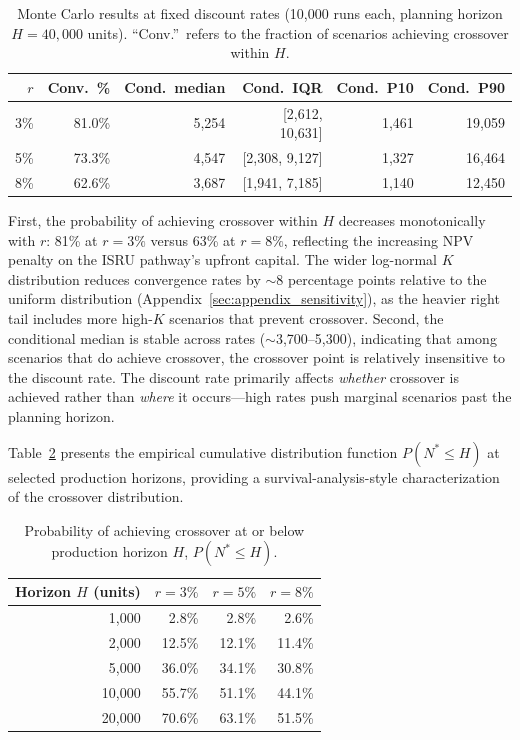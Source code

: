 \documentclass[preprint,12pt]{elsarticle}
\begin{document}
\begin{table}[htbp]
\centering
\caption{Monte Carlo results at fixed discount rates (10{,}000 runs each, planning horizon $H = 40{,}000$ units). ``Conv.''\ refers to the fraction of scenarios achieving crossover within $H$.}
\label{tab:mc_summary}
\small
\begin{tabular}{@{}rrrrrr@{}}
\toprule
$r$ & Conv.\ \% & Cond.\ median & Cond.\ IQR & Cond.\ P10 & Cond.\ P90 \\
\midrule
3\%  & 81.0\% & 5{,}254 & [2{,}612, 10{,}631] & 1{,}461 & 19{,}059 \\
5\%  & 73.3\% & 4{,}547 & [2{,}308, 9{,}127]  & 1{,}327 & 16{,}464 \\
8\%  & 62.6\% & 3{,}687 & [1{,}941, 7{,}185]  & 1{,}140 & 12{,}450 \\
\bottomrule
\end{tabular}
\end{table}

First, the probability of achieving crossover within $H$ decreases monotonically with $r$: 81\% at $r = 3\%$ versus 63\% at $r = 8\%$, reflecting the increasing NPV penalty on the ISRU pathway's upfront capital. The wider log-normal $K$ distribution reduces convergence rates by $\sim$8 percentage points relative to the uniform distribution (Appendix~\ref{sec:appendix_sensitivity}), as the heavier right tail includes more high-$K$ scenarios that prevent crossover. Second, the conditional median is stable across rates ($\sim$3{,}700--5{,}300), indicating that among scenarios that do achieve crossover, the crossover point is relatively insensitive to the discount rate. The discount rate primarily affects \emph{whether} crossover is achieved rather than \emph{where} it occurs---high rates push marginal scenarios past the planning horizon.

Table~\ref{tab:convergence} presents the empirical cumulative distribution function $P(N^* \leq H)$ at selected production horizons, providing a survival-analysis-style characterization of the crossover distribution.

\begin{table}[htbp]
\centering
\caption{Probability of achieving crossover at or below production horizon $H$, $P(N^* \leq H)$.}
\label{tab:convergence}
\small
\begin{tabular}{@{}rrrr@{}}
\toprule
Horizon $H$ (units) & $r = 3\%$ & $r = 5\%$ & $r = 8\%$ \\
\midrule
1{,}000  & 2.8\% & 2.8\% & 2.6\% \\
2{,}000  & 12.5\% & 12.1\% & 11.4\% \\
5{,}000  & 36.0\% & 34.1\% & 30.8\% \\
10{,}000 & 55.7\% & 51.1\% & 44.1\% \\
20{,}000 & 70.6\% & 63.1\% & 51.5\% \\
\bottomrule
\end{tabular}
\end{table}
\end{document}

